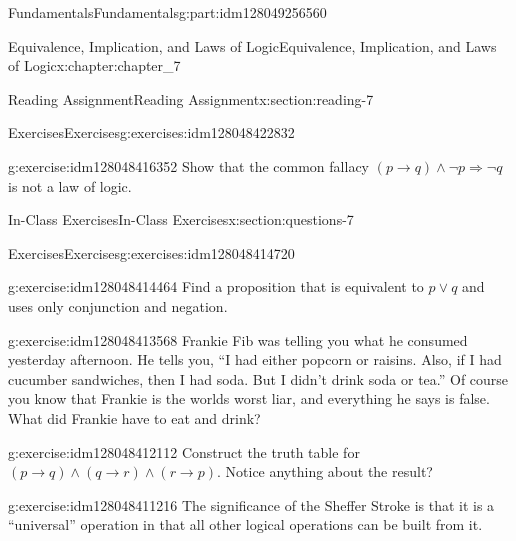 \documentclass[oneside,10pt,]{book}
\numberwithin{equation}{section}
\begin{document}
\begin{partptx}{Fundamentals}{}{Fundamentals}{}{}{g:part:idm128049256560}
\begin{chapterptx}{Equivalence, Implication, and Laws of Logic}{}{Equivalence, Implication, and Laws of Logic}{}{}{x:chapter:chapter_7}
\begin{sectionptx}{Reading Assignment}{}{Reading Assignment}{}{}{x:section:reading-7}
\begin{exercises-subsection}{Exercises}{}{Exercises}{}{}{g:exercises:idm128048422832}
\begin{exercisegroup}
\begin{divisionexerciseeg}{2}{}{}{g:exercise:idm128048416352}%
Show that the common fallacy \((p\to  q) \land  \neg p \Rightarrow  \neg q\) is not a law of logic.%
\end{divisionexerciseeg}%
\end{exercisegroup}
\par\medskip\noindent
\end{exercises-subsection}
\end{sectionptx}
%
%
\typeout{************************************************}
\typeout{************************************************}
%
\begin{sectionptx}{In-Class Exercises}{}{In-Class Exercises}{}{}{x:section:questions-7}
%
%
%
\typeout{************************************************}
\typeout{************************************************}
%
\begin{exercises-subsection}{Exercises}{}{Exercises}{}{}{g:exercises:idm128048414720}
\par\medskip\noindent%
%
\begin{exercisegroup}
\begin{divisionexerciseeg}{1}{}{}{g:exercise:idm128048414464}%
Find a proposition that is equivalent to \(p \lor  q\) and uses only conjunction and negation.%
\end{divisionexerciseeg}%
\begin{divisionexerciseeg}{2}{}{}{g:exercise:idm128048413568}%
Frankie Fib was telling you what he consumed yesterday afternoon. He tells you, ``I had either popcorn or raisins. Also, if I had cucumber sandwiches, then I had soda. But I didn't drink soda or tea.'' Of course you know that Frankie is the worlds worst liar, and everything he says is false. What did Frankie have to eat and drink?%
\end{divisionexerciseeg}%
\begin{divisionexerciseeg}{3}{}{}{g:exercise:idm128048412112}%
Construct the truth table for \((p \rightarrow q) \land (q \rightarrow r) \land (r \rightarrow p)\).   Notice anything about the result?%
\end{divisionexerciseeg}%
\begin{divisionexerciseeg}{4}{}{}{g:exercise:idm128048411216}%
The significance of the Sheffer Stroke is that it is a ``universal'' operation in that all other logical operations can be built from it.%
\begin{enumerate}[label=(\alph*)]

\end{enumerate}
\end{divisionexerciseeg}
\end{exercisegroup}
\end{exercises-subsection}
\end{sectionptx}
\end{chapterptx}
\end{partptx}
\end{document}

